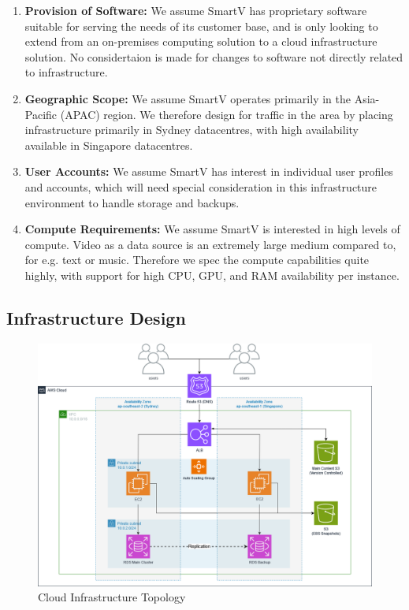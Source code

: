 \begin{enumerate}
    \item \textbf{Provision of Software:} We assume SmartV has proprietary software suitable for serving the needs of its customer base, and is only looking to extend from an on-premises computing solution to a cloud infrastructure solution. No considertaion is made for changes to software not directly related to infrastructure.
    \item \textbf{Geographic Scope:} We assume SmartV operates primarily in the Asia-Pacific (APAC) region. We therefore design for traffic in the area by placing infrastructure primarily in Sydney datacentres, with high availability available in Singapore datacentres.
    \item \textbf{User Accounts:} We assume SmartV has interest in individual user profiles and accounts, which will need special consideration in this infrastructure environment to handle storage and backups.
    \item \textbf{Compute Requirements:} We assume SmartV is interested in high levels of compute. Video as a data source is an extremely large medium compared to, for e.g. text or music. Therefore we spec the compute capabilities quite highly, with support for high CPU, GPU, and RAM availability per instance.
\end{enumerate}

\subsection{Infrastructure Design}

\begin{figure}[H]\label{fig:awsdiagram}
    \centering
    \includegraphics[width=\textwidth]{cci_aws}
    \caption{Cloud Infrastructure Topology}
\end{figure}

